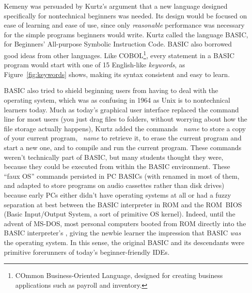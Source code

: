 Kemeny was persuaded by Kurtz's argument that a new language 
designed specifically for nontechnical beginners was needed.
Its design would be focused on ease of learning
and ease of use, since only \emph{reasonable} performance was necessary
for the simple programs beginners would write.
Kurtz called the language BASIC, for Beginners' All-purpose Symbolic
Instruction Code.
BASIC also  borrowed good ideas from other languages.
Like COBOL\footnote{COmmon Business-Oriented Language, designed for creating
business applications such as payroll and inventory.}, every statement in a BASIC
program would start with one of 15 English-like \emph{keywords}, as Figure~\ref{fig:keywords} shows,
making its syntax consistent and easy
to learn.


BASIC also tried to shield beginning users from having to deal with
the operating system, which was as confusing in 1964 as Unix is to
nontechnical learners today.
Much as today's graphical user interface replaced the command line for
most users (you just drag files to folders, without worrying about how
the file storage actually happens), Kurtz added the commands
~\emph{name} to store a copy of your current program,
~\emph{name} to retrieve it,  to erase the current
program and start a new one, and  to compile and run the
current program.
These commands weren't technically part of BASIC, but many students
thought they were, because they could be executed from within the
BASIC environment.
These ``faux OS'' commands persisted in PC BASICs (with 
renamed  in most of them, and adapted to store programs on
audio cassettes rather than disk drives) because early PCs either didn't have
operating systems at all or had a fuzzy separation at best between the
BASIC interpreter in ROM and the ROM~BIOS (Basic Input/Output System,
a sort of primitive OS kernel).
Indeed, until the advent of MS-DOS, most personal computers booted
from ROM directly into the BASIC interpreter's , giving
the newbie learner the impression that BASIC \emph{was} the operating
system.
In this sense, the original BASIC and its descendants were primitive
forerunners of today's beginner-friendly IDEs.

